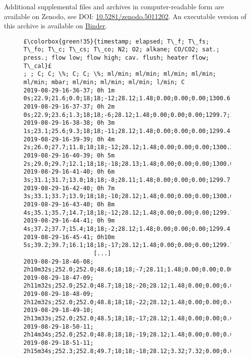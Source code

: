 \documentclass[12pt]{article}
\begin{document}
Additional supplemental files and archives in computer-readable form are available on Zenodo, see DOI: \href{https://doi.org/10.5281/zenodo.5011202}{10.5281/zenodo.5011202}. An executable version of this archive is available on \href{https://mybinder.org/v2/zenodo/10.5281/zenodo.5011202/?filepath=index.ipynb}{Binder}.

\clearpage
\begin{landscape}
\begin{figure}[tbh]
\begin{lstlisting}[escapechar=£,
    linewidth=24cm]
£\colorbox{green!35}{timestamp; elapsed; T\_f; T\_fs; T\_fo; T\_c; T\_cs; T\_co; N2; O2; alkane; CO/CO2; sat.; press.; flow low; flow high; cav. flush; heater flow; T\_cal}£
; ; C; C; \%; C; C; \%; ml/min; ml/min; ml/min; ml/min; ml/min; mbar; ml/min; ml/min; ml/min; l/min; C
2019-08-29-16-36-37; 0h 1m 0s;22.9;21.6;0.0;18;18;-12;28.12;1.48;0.00;0.00;0.00;1300.6;1.210;0.00;15;8;20.6
2019-08-29-16-37-37; 0h 2m 0s;22.9;23.6;1.3;18;18;-6;28.12;1.48;0.00;0.00;0.00;1299.7;1.210;0.00;15;8;21.0
2019-08-29-16-38-38; 0h 3m 1s;23.1;25.6;9.3;18;18;-11;28.12;1.48;0.00;0.00;0.00;1299.4;1.209;0.00;15;8;20.5
2019-08-29-16-39-39; 0h 4m 2s;26.0;27.7;11.8;18;18;-12;28.12;1.48;0.00;0.00;0.00;1300.3;1.211;0.00;15;8;21.0
2019-08-29-16-40-39; 0h 5m 2s;29.0;29.7;12.1;18;18;-18;28.13;1.48;0.00;0.00;0.00;1300.0;1.210;0.00;15;8;20.3
2019-08-29-16-41-40; 0h 6m 3s;31.1;31.7;13.0;18;18;-8;28.11;1.48;0.00;0.00;0.00;1299.7;1.210;0.00;15;8;20.1
2019-08-29-16-42-40; 0h 7m 3s;33.1;33.7;13.9;18;18;-10;28.12;1.48;0.00;0.00;0.00;1300.0;1.211;0.00;15;8;20.3
2019-08-29-16-43-40; 0h 8m 4s;35.1;35.7;14.7;18;18;-12;28.12;1.48;0.00;0.00;0.00;1299.7;1.210;0.00;15;8;20.3
2019-08-29-16-44-41; 0h 9m 4s;37.2;37.7;15.4;18;18;-2;28.12;1.48;0.00;0.00;0.00;1299.4;1.212;0.00;15;8;20.9
2019-08-29-16-45-41; 0h10m 5s;39.2;39.7;16.1;18;18;-17;28.12;1.48;0.00;0.00;0.00;1299.7;1.210;0.00;15;8;21.9
                    [...]
2019-08-29-18-46-08; 2h10m32s;252.0;252.0;48.6;18;18;-7;28.11;1.48;0.00;0.00;0.00;1300.0;1.211;0.00;15;8;20.2
2019-08-29-18-47-09; 2h11m32s;252.0;252.0;48.7;18;18;-20;28.12;1.48;0.00;0.00;0.00;1300.6;1.211;0.00;15;8;20.2
2019-08-29-18-48-09; 2h12m32s;252.0;252.0;48.8;18;18;-22;28.12;1.48;0.00;0.00;0.00;1300.6;1.211;0.00;15;8;20.2
2019-08-29-18-49-10; 2h13m33s;252.0;252.0;48.5;18;18;-17;28.12;1.48;0.00;0.00;0.00;1300.0;1.212;0.00;15;8;20.7
2019-08-29-18-50-11; 2h14m34s;252.0;252.0;48.8;18;18;-19;28.12;1.48;0.00;0.00;0.00;1300.0;1.211;0.00;15;8;20.6
2019-08-29-18-51-11; 2h15m34s;252.3;252.8;49.7;18;18;-18;28.12;3.32;7.32;0.00;0.00;1300.0;0.653;0.95;15;8;20.6

\end{lstlisting}
\end{figure}
\end{landscape}
\end{document}
